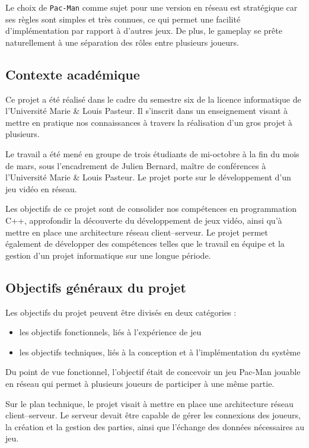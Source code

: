 \documentclass[a4paper, 11pt]{article}
\begin{document}
Le choix de \texttt{Pac-Man} comme sujet pour une version en réseau est stratégique car ses règles sont simples et très connues, ce qui permet une facilité d'implémentation par rapport à d'autres jeux. De plus, le gameplay se prête naturellement à une séparation des rôles entre plusieurs joueurs.

\subsection{Contexte académique}

Ce projet a été réalisé dans le cadre du semestre six de la licence informatique de l’Université Marie \& Louis Pasteur. Il s’inscrit dans un enseignement visant à mettre en pratique nos connaissances à travers la réalisation d’un gros projet à plusieurs.

Le travail a été mené en groupe de trois étudiants de mi-octobre à la fin du mois de mars, sous l’encadrement de Julien Bernard, maître de conférences à l’Université Marie \& Louis Pasteur. Le projet porte sur le développement d’un jeu vidéo en réseau.

Les objectifs de ce projet sont de consolider nos compétences en programmation C++, approfondir la découverte du développement de jeux vidéo, ainsi qu’à mettre en place une architecture réseau client–serveur. Le projet permet également de développer des compétences telles que le travail en équipe et la gestion d’un projet informatique sur une longue période.


\subsection{Objectifs généraux du projet}

Les objectifs du projet peuvent être divisés en deux catégories : 
\begin{itemize}
    \item les objectifs fonctionnels, liés à l’expérience de jeu
    \item les objectifs techniques, liés à la conception et à l’implémentation du système\\
\end{itemize}


Du point de vue fonctionnel, l’objectif était de concevoir un jeu Pac-Man jouable en réseau qui permet à plusieurs joueurs de participer à une même partie.

Sur le plan technique, le projet visait à mettre en place une architecture réseau client–serveur. Le serveur devait être capable de gérer les connexions des joueurs, la création et la gestion des parties, ainsi que l’échange des données nécessaires au jeu.
\end{document}
